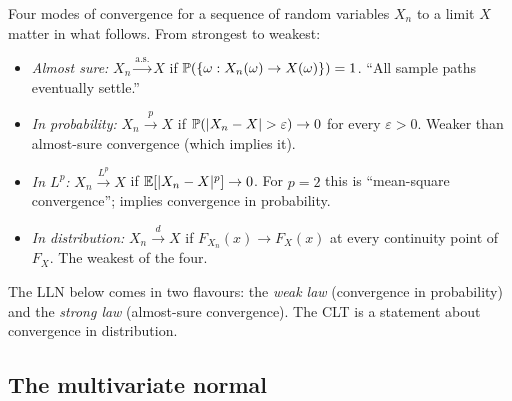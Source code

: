 Four modes of convergence for a sequence of random variables $X_n$ to
a limit $X$ matter in what follows. From strongest to weakest:
\begin{itemize}
  \item \emph{Almost sure:} $X_n \xrightarrow{\text{a.s.}} X$ if
        $\mathbb{P}(\{\omega : X_n(\omega) \to X(\omega)\}) = 1$.
        ``All sample paths eventually settle.''
  \item \emph{In probability:} $X_n \xrightarrow{p} X$ if
        $\mathbb{P}(|X_n - X| > \varepsilon) \to 0$ for every
        $\varepsilon > 0$. Weaker than almost-sure convergence (which
        implies it).
  \item \emph{In $L^p$:} $X_n \xrightarrow{L^p} X$ if
        $\mathbb{E}[|X_n - X|^p] \to 0$. For $p = 2$ this is ``mean-square
        convergence''; implies convergence in probability.
  \item \emph{In distribution:} $X_n \xrightarrow{d} X$ if
        $F_{X_n}(x) \to F_X(x)$ at every continuity point of $F_X$.
        The weakest of the four.
\end{itemize}
The LLN below comes in two flavours: the \emph{weak law} (convergence
in probability) and the \emph{strong law} (almost-sure convergence).
The CLT is a statement about convergence in distribution.

\subsection{The multivariate normal}

